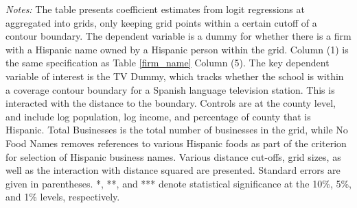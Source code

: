 \begin{table}[!h]
{\begin{threeparttable}
			\begin{tablenotes}[flushleft]
				\item \textit{Notes:} The table presents coefficient estimates from logit regressions at aggregated into grids, only keeping grid points within a certain cutoff of a contour boundary. The dependent variable is a dummy for whether there is a firm with a Hispanic name owned by a Hispanic person within the grid. Column (1) is the same specification as Table \ref{firm_name} Column (5). The key dependent variable of interest is the TV Dummy, which tracks whether the school is within a coverage contour boundary for a Spanish language television station. This is interacted with the distance to the boundary. Controls are at the county level, and include log population, log income, and percentage of county that is Hispanic. Total Businesses is the total number of businesses in the grid, while No Food Names removes references to various Hispanic foods as part of the criterion for selection of Hispanic business names. Various distance cut-offs, grid sizes, as well as the interaction with distance squared are presented. Standard errors are given in parentheses. *, **, and *** denote statistical significance at the 10\%, 5\%, and 1\% levels, respectively.
			\end{tablenotes}
		\end{threeparttable}
	}
\end{table}